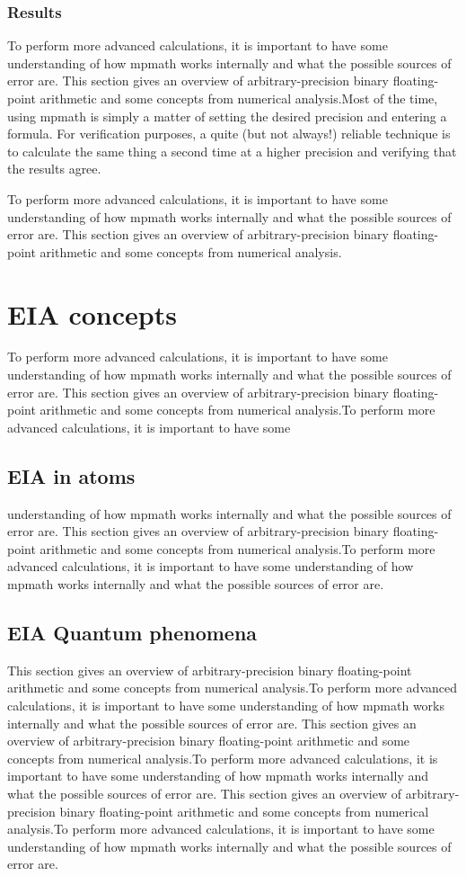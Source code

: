 \subsubsection*{Results}
To perform more advanced calculations, it is important to have some understanding of how mpmath works internally and what the possible sources of error are. This section gives an overview of arbitrary-precision binary floating-point arithmetic and some concepts from numerical analysis.Most of the time, using mpmath is simply a matter of setting the desired precision and entering a formula. For verification purposes, a quite (but not always!) reliable technique is to calculate the same thing a second time at a higher precision and verifying that the results agree.

To perform more advanced calculations, it is important to have some understanding of how mpmath works internally and what the possible sources of error are. This section gives an overview of arbitrary-precision binary floating-point arithmetic and some concepts from numerical analysis.


\section{EIA concepts}
To perform more advanced calculations, it is important to have some understanding of how mpmath works internally and what the possible sources of error are. This section gives an overview of arbitrary-precision binary floating-point arithmetic and some concepts from numerical analysis.To perform more advanced calculations, it is important to have some
\subsection{EIA in atoms}
 understanding of how mpmath works internally and what the possible sources of error are. This section gives an overview of arbitrary-precision binary floating-point arithmetic and some concepts from numerical analysis.To perform more advanced calculations, it is important to have some understanding of how mpmath works internally and what the possible sources of error are. 
\subsection{EIA Quantum phenomena} 
 This section gives an overview of arbitrary-precision binary floating-point arithmetic and some concepts from numerical analysis.To perform more advanced calculations, it is important to have some understanding of how mpmath works internally and what the possible sources of error are. This section gives an overview of arbitrary-precision binary floating-point arithmetic and some concepts from numerical analysis.To perform more advanced calculations, it is important to have some understanding of how mpmath works internally and what the possible sources of error are. This section gives an overview of arbitrary-precision binary floating-point arithmetic and some concepts from numerical analysis.To perform more advanced calculations, it is important to have some understanding of how mpmath works internally and what the possible sources of error are.
